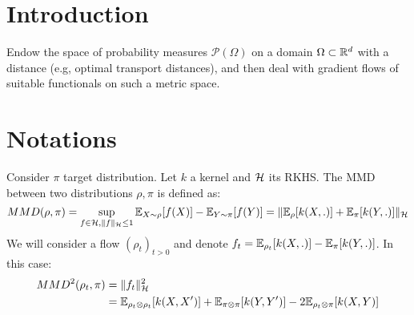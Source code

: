 
\section{Introduction}
Endow the space of probability measures $\mathcal{P}(\Omega)$ on a domain $\Omega \subset {{\mathbb R}}^d$ with a distance (e.g, optimal transport distances), and then deal with gradient flows of suitable functionals on such a metric space.

\section{Notations}
Consider $\pi$ target distribution. Let $k$ a kernel and ${{\mathcal H}}$ its RKHS. The MMD between two distributions $\rho,\pi$ is defined as:
\begin{equation}
MMD(\rho,\pi)=\sup_{f \in {{\mathcal H}},  \|f\|_{{{\mathcal H}}}\le 1} {{\mathbb E}}_{X \sim \rho}[f(X)]-{{\mathbb E}}_{Y \sim \pi}[f(Y)]=\|{{\mathbb E}}_{\rho}[k(X,.)] + {{\mathbb E}}_{\pi}[k(Y,.)]\|_{{{\mathcal H}}}
\end{equation}
We will consider a flow $(\rho_t)_{t>0}$ and denote $f_t= {{\mathbb E}}_{\rho_t}[k(X,.)]- {{\mathbb E}}_{\pi}[k(Y,.)]$. In this case:
\begin{align}
MMD^2(\rho_t,\pi)&=\|f_t\|^2_{{{\mathcal H}}}\\
&= {{\mathbb E}}_{\rho_t \otimes \rho_t}[k(X,X')]+{{\mathbb E}}_{\pi \otimes \pi}[k(Y,Y')] - 2{{\mathbb E}}_{\rho_t \otimes \pi}[k(X,Y)]
\end{align} 
